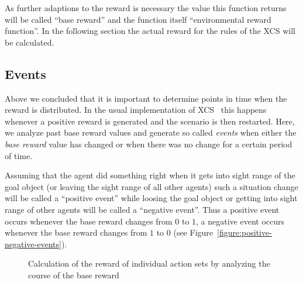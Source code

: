 
As further adaptions to the reward is necessary the value this function returns will be called ``base reward'' and the function itself ``environmental reward function''. In the following section the actual reward for the rules of the XCS will be calculated. 

\subsection{Events}
\label{subsection:events}

Above we concluded that it is important to determine points in time when the reward is distributed. In the usual implementation of XCS~\cite{BW02} this happens whenever a positive reward is generated and the scenario is then restarted. Here, we analyze past base reward values and generate so called \emph{events} when either the \emph{base reward} value has changed or when there was no change for a certain period of time.

Assuming that the agent did something right when it gets into sight range of the goal object (or leaving the sight range of all other agents) such a situation change will be called a ``positive event'' while loosing the goal object or getting into sight range of other agents will be called a ``negative event''. Thus a positive event occurs whenever the base reward changes from $0$ to $1$, a negative event occurs whenever the base reward changes from $1$ to $0$ (see Figure~\ref{figure:positive-negative-events}).

\begin{figure*}[ht]
  \hfill{}\hfill{}
\caption{Calculation of the reward of individual action sets by analyzing the course of the base reward}\label{figure:experiment}
\end{figure*}

